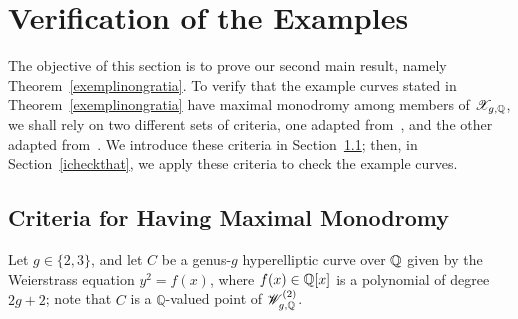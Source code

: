 \section{Verification of the Examples}\label{verified}

The objective of this section is to prove our second main result, namely Theorem~\ref{exemplinongratia}. To verify that the example curves stated in Theorem~\ref{exemplinongratia} have maximal monodromy among members of $\mathscr X_{g, \mathbb Q}$, we shall rely on two different sets of criteria, one adapted from~\cite{anni2017constructing}, and the other adapted from~\cite{seaweed}. We introduce these criteria in Section~\ref{sweenytime}; then, in Section~\ref{icheckthat}, we apply these criteria to check the example curves.

\subsection{Criteria for Having Maximal Monodromy}\label{sweenytime}

Let $g \in \{2,3\}$, and let $C$ be a genus-$g$ hyperelliptic curve over $\mathbb Q$ given by the Weierstrass equation $y^2 = f(x)$, where $f(x) \in {\mathbb Q}[x]$ is a polynomial of degree $2g+2$; note that $C$ is a $\mathbb Q$-valued point of $\mathscr W_{g, \mathbb Q}^{(2)}$.


